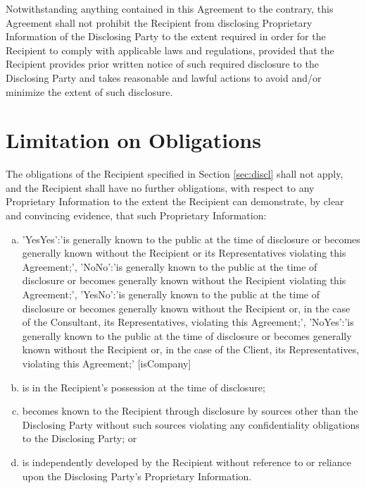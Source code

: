 \documentclass[12pt]{article}
\newcommand{\VAR}[1]{{\color{blue}#1}}
\begin{document}
Notwithstanding anything contained in this Agreement to the contrary, this Agreement shall not prohibit the Recipient from disclosing Proprietary Information of the Disclosing Party to the extent required in order for the Recipient to comply with applicable laws and regulations, provided that the Recipient provides prior written notice of such required disclosure to the Disclosing Party and takes reasonable and lawful actions to avoid and/or minimize the extent of such disclosure.

\section{Limitation on Obligations}\label{sec:limitOblig}
The obligations of the Recipient specified in Section \ref{sec:discl} shall not apply, and the Recipient shall have no further obligations, with respect to any Proprietary Information to the extent the Recipient can demonstrate, by clear and convincing evidence, that such Proprietary Information:
\begin{enumerate}[a)]
\item
\VAR{
    {
        'YesYes':'is generally known to the public at the time of disclosure or becomes generally known without the Recipient or its Representatives violating this Agreement;',
        'NoNo':'is generally known to the public at the time of disclosure or becomes generally known without the Recipient violating this Agreement;',
        'YesNo':'is generally known to the public at the time of disclosure or becomes generally known without the Recipient or, in the case of the Consultant, its Representatives, violating this Agreement;',
        'NoYes':'is generally known to the public at the time of disclosure or becomes generally known without the Recipient or, in the case of the Client, its Representatives, violating this Agreement;'
    }[isCompany]
}
\item is in the Recipient’s possession at the time of disclosure;
\item becomes known to the Recipient through disclosure by sources other than the Disclosing Party without such sources violating any confidentiality obligations to the Disclosing Party; or
\item is independently developed by the Recipient without reference to or reliance upon the Disclosing Party's Proprietary Information.
\end{enumerate}
\end{document}
